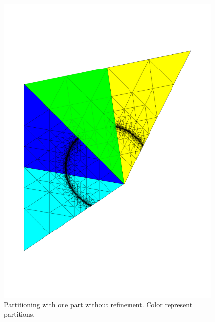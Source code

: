 \documentclass{article}
\begin{document}
\begin{figure}[htbp]
	\centering
	\includegraphics[width=0.8\linewidth]{figures/partitioning_with_one_part_without_refinement}
	\caption{Partitioning with one part without refinement. Color represent partitions.}
	\label{fig:par_refinement}
\end{figure}
\end{document}
